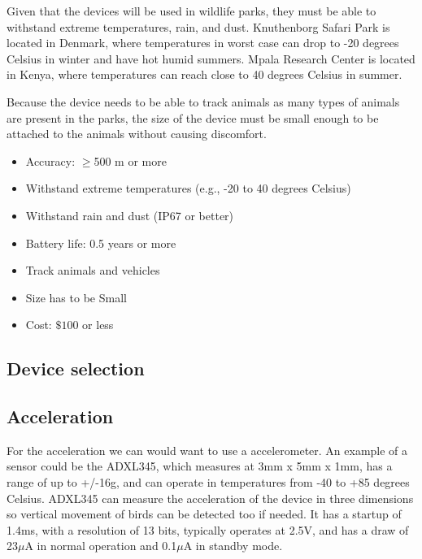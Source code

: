 Given that the devices will be used in wildlife parks, they must be able to withstand extreme temperatures, rain, and dust. Knuthenborg Safari Park is located in Denmark, where temperatures in worst case can drop to -20 degrees Celsius in winter and have hot humid summers. Mpala Research Center is located in Kenya, where temperatures can reach close to 40 degrees Celsius in summer. 

Because the device needs to be able to track animals as many types of animals are present in the parks, the size of the device must be small enough to be attached to the animals without causing discomfort. 

\begin{itemize}
  \item Accuracy: $\geq$500 m or more
  \item Withstand extreme temperatures (e.g., -20 to 40 degrees Celsius)
  \item Withstand rain and dust (IP67 or better)
  \item Battery life: 0.5 years or more
  \item Track animals and vehicles
  \item Size has to be Small
  \item Cost: $\mathdollar100$ or less
\end{itemize}


\subsection{Device selection}

\subsection{Acceleration}
For the acceleration we can would want to use a accelerometer. An example of a sensor could be the ADXL345, which measures at 3mm x 5mm x 1mm, has a range of up to +/-16g, and can operate in temperatures from -40 to +85 degrees Celsius. ADXL345 can measure the acceleration of the device in three dimensions so vertical movement of birds can be detected too if needed. It has a startup of 1.4ms, with a resolution of 13 bits, typically operates at 2.5V, and has a draw of 23$\mu$A in normal operation and 0.1$\mu$A in standby mode\cite{adxl345}.

